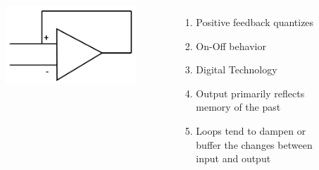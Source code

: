 \documentclass{beamer}
\begin{document}
\begin{frame}
\begin{columns}[c]
\begin{figure}
\includegraphics[width=1\linewidth]{positive}
\end{figure}
\vspace{-4ex}
\begin{enumerate}
\item Positive feedback quantizes
\item On-Off behavior
\item Digital Technology
\item Output primarily reflects memory of the past
\item Loops tend to dampen or buffer the changes between input and output
\end{enumerate}

\end{columns}
\end{frame}

\end{document}
